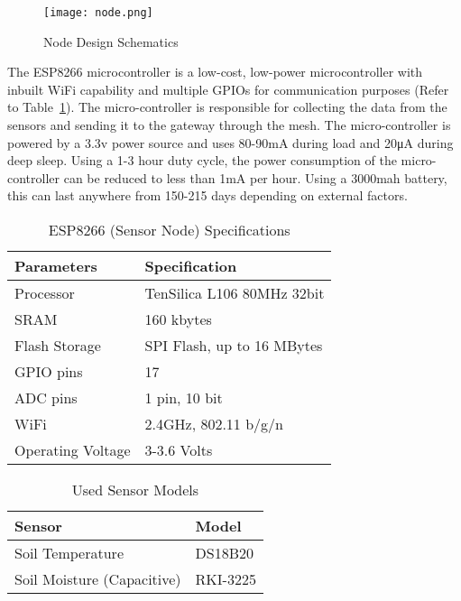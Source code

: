   \begin{figure}[!h]
    \centering
    \texttt{[image: node.png]}
    \caption{Node Design Schematics}
    \label{fig:node}
  \end{figure}

  The ESP8266 microcontroller is a low-cost, low-power microcontroller with inbuilt WiFi capability and multiple GPIOs for communication purposes (Refer to Table~\ref{table:nodespecs}). The micro-controller is responsible for collecting the data from the sensors and sending it to the gateway through the mesh. The micro-controller is powered by a 3.3v power source and uses 80-90mA during load and 20\si{\micro\ampere} during deep sleep. Using a 1-3 hour duty cycle, the power consumption of the micro-controller can be reduced to less than 1mA per hour. Using a 3000mah battery, this can last anywhere from 150-215 days depending on external factors.
  
  \begin{table}[h]
    \centering
    \begin{tabular}{ p{5cm} p{5cm}}
      \hline
      \textbf{Parameters} & \textbf{Specification}\\
      \hline
      Processor & TenSilica L106 80MHz 32bit\\
      SRAM & 160 kbytes\\
      Flash Storage & SPI Flash, up to 16 MBytes\\
      GPIO pins & 17\\
      ADC pins & 1 pin, 10 bit\\
      WiFi & 2.4GHz, 802.11 b/g/n\\
      Operating Voltage & 3-3.6 Volts\\
      \hline
    \end{tabular}
    \caption{ESP8266 (Sensor Node) Specifications} 
    \label{table:nodespecs}
  \end{table}

  \FloatBarrier
  \begin{table}[h]
    \centering
    \begin{tabular}{ p{5cm} p{5cm}}
      \hline
      \textbf{Sensor} & \textbf{Model}\\
      \hline
      Soil Temperature & DS18B20\\
      Soil Moisture (Capacitive) & RKI-3225\\
      \hline
    \end{tabular}
    \caption{Used Sensor Models} 
    \label{table:sensors}
  \end{table}

